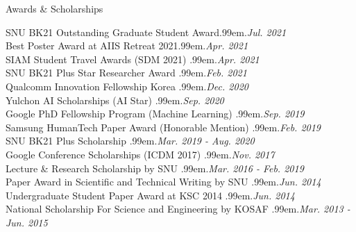 \documentclass{resume} %
\makeatletter
\newcommand \Dotfill {\leavevmode \cleaders \hb@xt@ .99em{\hss .\hss }\hfill \kern \z@}
\makeatother
\begin{document}

\begin{rSection}{Awards \& Scholarships}

SNU BK21 Outstanding Graduate Student Award\smallskip \Dotfill \emph{Jul. 2021} \\ 
Best Poster Award at AIIS Retreat 2021\smallskip \Dotfill \emph{Apr. 2021} \\ 
SIAM Student Travel Awards (SDM 2021) \smallskip \Dotfill \emph{Apr. 2021} \\ 
SNU BK21 Plus Star Researcher Award \smallskip \Dotfill \emph{Feb. 2021} \\ 
Qualcomm Innovation Fellowship Korea \smallskip \Dotfill \emph{Dec. 2020} \\ 
Yulchon AI Scholarships (AI Star) \smallskip \Dotfill \emph{Sep. 2020} \\ 
Google PhD Fellowship Program (Machine Learning) \smallskip \Dotfill \emph{Sep. 2019} \\ 
Samsung HumanTech Paper Award (Honorable Mention) \smallskip \Dotfill \emph{Feb. 2019} \\ 
SNU BK21 Plus Scholarship \smallskip \Dotfill \emph{Mar. 2019 - Aug. 2020} \\ 
Google Conference Scholarships (ICDM 2017) \smallskip \Dotfill \emph{Nov. 2017} \\ 
Lecture \& Research Scholarship by SNU \smallskip \Dotfill \emph{Mar. 2016 - Feb. 2019} \\ 
Paper Award in Scientific and Technical Writing by SNU \smallskip \Dotfill \emph{Jun. 2014} \\ 
Undergraduate Student Paper Award at KSC 2014 \smallskip \Dotfill \emph{Jun. 2014} \\
National Scholarship For Science and Engineering by KOSAF \smallskip \Dotfill \emph{Mar. 2013 - Jun. 2015}

\end{rSection}

\end{document}
